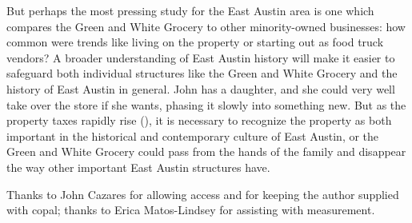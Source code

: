 But perhaps the most pressing study for the East Austin area is one which compares the Green and White Grocery to other minority-owned businesses: how common were trends like living on the property or starting out as food truck vendors? A broader understanding of East Austin history will make it easier to safeguard both individual structures like the Green and White Grocery and the history of East Austin in general. John has a daughter, and she could very well take over the store if she wants, phasing it slowly into something new. But as the property taxes rapidly rise (\cite{tcad}), it is necessary to recognize the property as both important in the historical and contemporary culture of East Austin, or the Green and White Grocery could pass from the hands of the family and disappear the way other important East Austin structures have.

\IJSRAseparator

Thanks to John Cazares for allowing access and for keeping the author supplied with copal; thanks to Erica Matos-Lindsey for assisting with measurement.

\IJSRAclosing%
